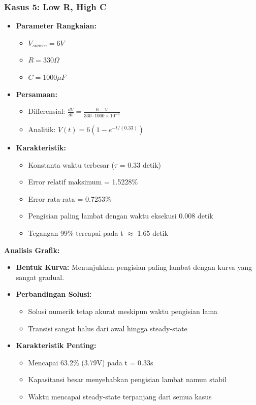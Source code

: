 \documentclass[conference]{IEEEtran}
\begin{document}
\subsubsection{Kasus 5: Low R, High C}
\begin{itemize}
\item \textbf{Parameter Rangkaian:}
  \begin{itemize}
  \item $V_{source} = 6V$
  \item $R = 330\Omega$
  \item $C = 1000\mu F$
  \end{itemize}
\item \textbf{Persamaan:}
  \begin{itemize}
  \item Differensial: $\frac{dV}{dt} = \frac{6 - V}{330 \cdot 1000\times10^{-6}}$
  \item Analitik: $V(t) = 6(1 - e^{-t/(0.33)})$
  \end{itemize}
\item \textbf{Karakteristik:}
  \begin{itemize}
  \item Konstanta waktu terbesar ($\tau$ = 0.33 detik)
  \item Error relatif maksimum = 1.5228\%
  \item Error rata-rata = 0.7253\%
  \item Pengisian paling lambat dengan waktu eksekusi 0.008 detik
  \item Tegangan 99\% tercapai pada t $\approx$ 1.65 detik
  \end{itemize}
\end{itemize}

\textbf{Analisis Grafik:}
\begin{itemize}
\item \textbf{Bentuk Kurva:} Menunjukkan pengisian paling lambat dengan kurva yang sangat gradual.
\item \textbf{Perbandingan Solusi:}
  \begin{itemize}
  \item Solusi numerik tetap akurat meskipun waktu pengisian lama
  \item Transisi sangat halus dari awal hingga steady-state
  \end{itemize}
\item \textbf{Karakteristik Penting:}
  \begin{itemize}
  \item Mencapai 63.2\% (3.79V) pada t = 0.33s
  \item Kapasitansi besar menyebabkan pengisian lambat namun stabil
  \item Waktu mencapai steady-state terpanjang dari semua kasus
  \end{itemize}
\end{itemize}
\end{document}
